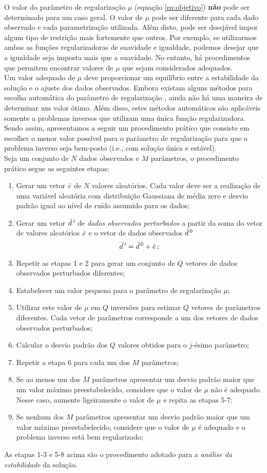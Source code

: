 O valor do parâmetro de regularização $\mu$ (equação \ref{eq:objetivo}) {\bf não}
pode ser determinado para um caso geral.
O valor de $\mu$ pode ser diferente para cada dado observado e cada parametrização
utilizada.
Além disto, pode ser desejável impor algum tipo de restrição mais fortemente
que outros. Por exemplo, se utilizarmos ambas as funções regularizadoras de
suavidade e igualdade, podemos desejar que a igualdade seja imposta mais que a
suavidade. No entanto, há procedimentos que permitem encontrar valores de $\mu$
que sejam considerados adequados. 
\\
\indent Um valor adequado de $\mu$ deve proporcionar um equilíbrio entre
a estabilidade da solução e o ajuste dos dados observados.
Embora existam alguns métodos para escolha automática do parâmetro de regularização
\citep{aster}, ainda não há uma maneira de determinar um valor ótimo.
Além disso, estes métodos automáticos são aplicáveis somente a problemas inversos
que utilizam uma única função regularizadora.
Sendo assim, apresentamos a seguir um procedimento prático que consiste em escolher o
menor valor possível para o parâmetro de regularização para que o problema
inverso seja bem-posto (i.e., com solução única e estável).
\\
\indent Seja um conjunto de $N$ dados observados e $M$ parâmetros,
o procedimento prático segue as seguintes etapas:

\begin{enumerate}
\item Gerar um vetor $\bar{e}$ de $N$ valores aleatórios.
Cada valor deve ser a realização de uma variável aleatória com distribuição
Gaussiana de média zero e desvio padrão igual ao nível de ruído assumido
para os dados;
\item Gerar um vetor $\bar{d}\thinspace'$ de {\it dados observados perturbados} a partir
da soma do vetor de valores aleatórios $\bar{e}$ e o vetor de dados observados
$\bar{d}^{\thinspace 0}$
\[
\bar{d}\thinspace' = \bar{d}^{\thinspace 0} + \bar{e} \thinspace ;
\]
\item Repetir as etapas 1 e 2 para gerar um conjunto de $Q$ vetores de dados
observados perturbados diferentes;
\item Estabelecer um valor pequeno para o parâmetro de regularização $\mu$;
\item Utilizar este valor de $\mu$ em $Q$ inversões para estimar $Q$ vetores de
parâmetros diferentes. Cada vetor de parâmetros corresponde a um dos vetores de
dados observados perturbados;
\item Calcular o desvio padrão dos $Q$ valores obtidos para o $j$-ésimo parâmetro;
\item Repetir a etapa 6 para cada um dos $M$ parâmetros;
\item Se ao menos um dos $M$ parâmetros apresentar um desvio padrão maior que um
valor máximo preestabelecido, considere que o valor de $\mu$ não é adequado.
Nesse caso, aumente ligeiramente o valor de $\mu$ e repita as etapas 5-7;
\item Se nenhum dos $M$ parâmetros apresentar um desvio padrão maior que um
valor máximo preestabelecido, considere que o valor de $\mu$ é adequado e o
problema inverso está bem regularizado;
\end{enumerate}

\noindent As etapas 1-3 e 5-8 acima são o procedimento adotado para a
{\it análise da estabilidade} da solução.
